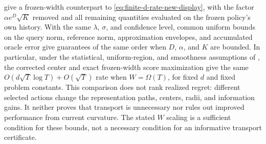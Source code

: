 \begin{remark}
 give a frozen-width
counterpart to \eqref{eq:finite-d-rate-new-display}, with the factor
$\alpha e^D\sqrt K$ removed and all remaining quantities evaluated on the
frozen policy's own history.  With the same $\lambda$, $\sigma$, and
confidence level, common uniform bounds on the query norm, reference norm,
approximation envelopes, and accumulated oracle error give guarantees of the
same order when $D$, $\alpha$, and $K$ are bounded.  In particular, under the
statistical, uniform-region, and smoothness assumptions of
, the corrected center and exact
frozen-width score maximization give the same
$O(d\sqrt T\log T)+O(\sqrt T)$ rate when $W=\Omega(T)$, for fixed $d$
and fixed problem constants.
This comparison does not rank realized regret: different selected actions
change the representation paths, centers, radii, and information gains.
It neither proves that transport is unnecessary nor rules out improved
performance from current curvature.  The stated $W$ scaling is a sufficient
condition for these bounds, not a necessary condition for an informative
transport certificate.
\end{remark}
